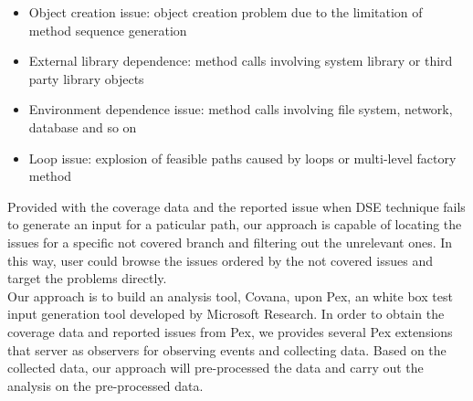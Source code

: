 \begin{itemize}
	\item Object creation issue: object creation problem due to the limitation of method sequence generation 
	\item External library dependence: method calls involving system library or third party library objects
	\item Environment dependence issue: method calls involving file system, network, database and so on
	\item Loop issue: explosion of feasible paths caused by loops or multi-level factory method 
\end{itemize}
Provided with the coverage data and the reported issue when DSE technique fails to generate an input for a paticular path, our approach is capable of locating the issues for a specific not covered branch and filtering out the unrelevant ones. In this way, user could browse the issues ordered by the not covered issues and target the problems directly. 
\\Our approach is to build an analysis tool, Covana, upon Pex, an white box test input generation tool developed by Microsoft Research. In order to obtain the coverage data and reported issues from Pex, we provides several Pex extensions that server as observers for observing events and collecting data. Based on the collected data, our approach will pre-processed the data and carry out the analysis on the pre-processed data. 


 

